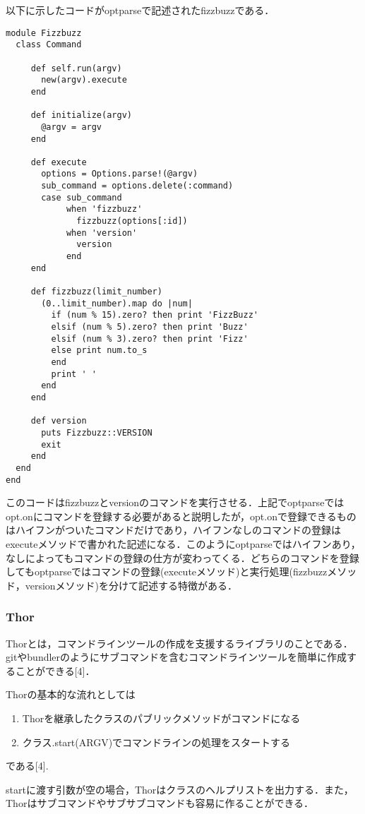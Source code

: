 以下に示したコードがoptparseで記述されたfizzbuzzである．
\begin{lstlisting}[style=customRuby]
module Fizzbuzz
  class Command

     def self.run(argv)
       new(argv).execute
     end

     def initialize(argv)
       @argv = argv
     end

     def execute
       options = Options.parse!(@argv)
       sub_command = options.delete(:command)
       case sub_command
            when 'fizzbuzz'
              fizzbuzz(options[:id])
            when 'version'
              version
            end
     end

     def fizzbuzz(limit_number)
       (0..limit_number).map do |num|
         if (num % 15).zero? then print 'FizzBuzz'
         elsif (num % 5).zero? then print 'Buzz'
         elsif (num % 3).zero? then print 'Fizz'
         else print num.to_s
         end
         print ' '
       end
     end

     def version
       puts Fizzbuzz::VERSION
       exit
     end
  end
end
\end{lstlisting}
このコードはfizzbuzzとversionのコマンドを実行させる．上記でoptparseではopt.onにコマンドを登録する必要があると説明したが，opt.onで登録できるものはハイフンがついたコマンドだけであり，ハイフンなしのコマンドの登録はexecuteメソッドで書かれた記述になる．このようにoptparseではハイフンあり，なしによってもコマンドの登録の仕方が変わってくる．どちらのコマンドを登録してもoptparseではコマンドの登録(executeメソッド)と実行処理(fizzbuzzメソッド，versionメソッド)を分けて記述する特徴がある．

\subsubsection{Thor}
Thorとは，コマンドラインツールの作成を支援するライブラリのことである．gitやbundlerのようにサブコマンドを含むコマンドラインツールを簡単に作成することができる[4]．

Thorの基本的な流れとしては

\begin{enumerate}
\item Thorを継承したクラスのパブリックメソッドがコマンドになる
\item クラス.start(ARGV)でコマンドラインの処理をスタートする
\end{enumerate}
である[4].

startに渡す引数が空の場合，Thorはクラスのヘルプリストを出力する．また，Thorはサブコマンドやサブサブコマンドも容易に作ることができる．

